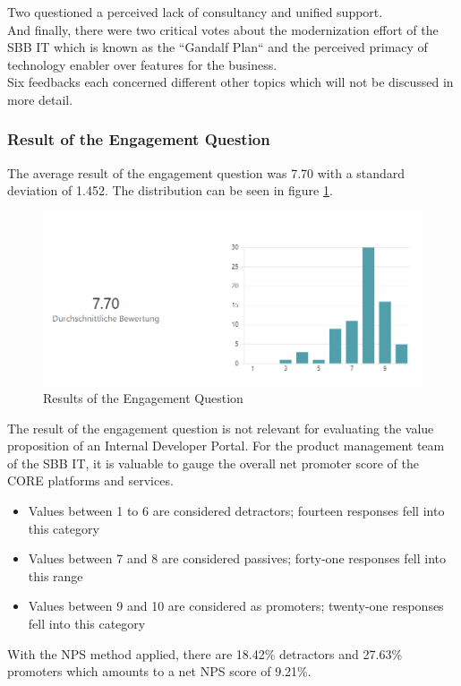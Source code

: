 \documentclass[a4paper,10pt]{article}
\begin{document}
    Two questioned a perceived lack of consultancy and unified support.\\
    And finally, there were two critical votes about the modernization effort of the SBB IT which is known as the
    ``Gandalf Plan`` and the perceived primacy of technology enabler over features for the business.\\
    Six feedbacks each concerned different other topics which will not be discussed in more detail.

    \subsubsection{Result of the Engagement Question}
    \label{sssec:rengque}
    The average result of the engagement question was 7.70 with a standard deviation of 1.452.
    The distribution can be seen in figure \ref{fig:engque}.
    \begin{figure}
        \includegraphics[width=\linewidth]{engagement.PNG}
        \caption{Results of the Engagement Question}
        \label{fig:engque}
    \end{figure}
    The result of the engagement question is not relevant for evaluating the value proposition of an Internal Developer Portal.
    For the product management team of the SBB IT, it is valuable to gauge the overall net promoter score\parencite{nps}
    of the CORE platforms and services.
    \begin{itemize}
        \item Values between 1 to 6 are considered detractors; fourteen responses fell into this category
        \item Values between 7 and 8 are considered passives; forty-one responses fell into this range
        \item Values between 9 and 10 are considered as promoters; twenty-one responses fell into this category
    \end{itemize}
    With the NPS method applied, there are 18.42\% detractors and 27.63\% promoters which amounts to a net NPS score of
    9.21\%.
\end{document}
